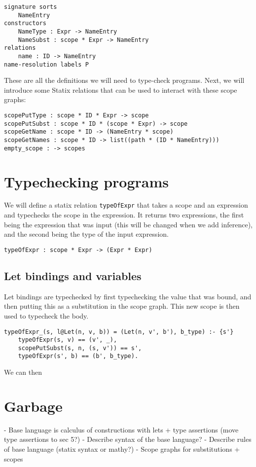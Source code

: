 \begin{lstlisting}
signature sorts
	NameEntry
constructors
	NameType : Expr -> NameEntry
	NameSubst : scope * Expr -> NameEntry
relations
	name : ID -> NameEntry
name-resolution	labels P
\end{lstlisting}

These are all the definitions we will need to type-check programs. Next, we will introduce some Statix relations that can be used to interact with these scope graphs:

\begin{lstlisting}
scopePutType : scope * ID * Expr -> scope
scopePutSubst : scope * ID * (scope * Expr) -> scope
scopeGetName : scope * ID -> (NameEntry * scope)
scopeGetNames : scope * ID -> list((path * (ID * NameEntry)))
empty_scope : -> scopes
\end{lstlisting}

\section{Typechecking programs}

We will define a statix relation \verb|typeOfExpr| that takes a scope and an expression and typechecks the scope in the expression. It returns two expressions, the first being the expression that was input (this will be changed when we add inference), and the second being the type of the input expression.

\begin{lstlisting}
typeOfExpr : scope * Expr -> (Expr * Expr)
\end{lstlisting}

\subsection{Let bindings and variables}

Let bindings are typechecked by first typechecking the value that was bound, and then putting this as a substitution in the scope graph. This new scope is then used to typecheck the body.

\begin{lstlisting}
typeOfExpr_(s, l@Let(n, v, b)) = (Let(n, v', b'), b_type) :- {s'}
	typeOfExpr(s, v) == (v', _),
	scopePutSubst(s, n, (s, v')) == s',
	typeOfExpr(s', b) == (b', b_type).
\end{lstlisting}

We can then 





\section{Garbage}

- Base language is calculus of constructions with lets + type assertions (move type assertions to sec 5?)
- Describe syntax of the base language?
- Describe rules of base language (statix syntax or mathy?)
- Scope graphs for substitutions + scopes